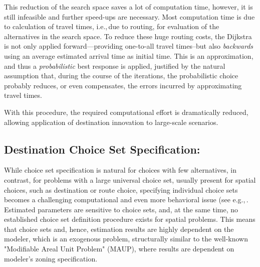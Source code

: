 This reduction of the search space saves a lot of computation time, however, it is still infeasible and further speed-ups are necessary. Most computation time is due to calculation of travel times, i.e.,\,due to routing, for evaluation of the alternatives in the search space. To reduce these huge routing costs, the Dijkstra is not only applied forward---providing one-to-all travel times--but also \emph{backwards} using an average estimated arrival time as initial time. This is an approximation, and thus a \emph{probabilistic} best response is applied, justified by the natural assumption that, during the course of the iterations, the probabilistic choice probably reduces, or even compensates, the errors incurred by approximating travel times. 

With this procedure, the required computational effort is dramatically reduced, allowing application of destination innovation to large-scale scenarios.

\subsection{Destination Choice Set Specification:}
While choice set specification is natural for choices with few alternatives, in contrast, for problems with a large universal choice set, usually present for spatial choices, such as destination or route choice, specifying individual choice sets becomes a challenging computational and even more behavioral issue (see e.g.,\,\citet[][]{PagliaraTimmermans_TransLett_2009, Thill_PHG_1992, Schuessler_PhDThesis_2010, FrejingerEtAl_TransResB_2009}. Estimated parameters are sensitive to choice sets, and, at the same time, no established choice set definition procedure exists for spatial problems. This means that choice sets and, hence, estimation results are highly dependent on the modeler, which is an exogenous problem, structurally similar to the well-known "Modifiable Areal Unit Problem" (MAUP), where results are dependent on modeler's zoning specification.

